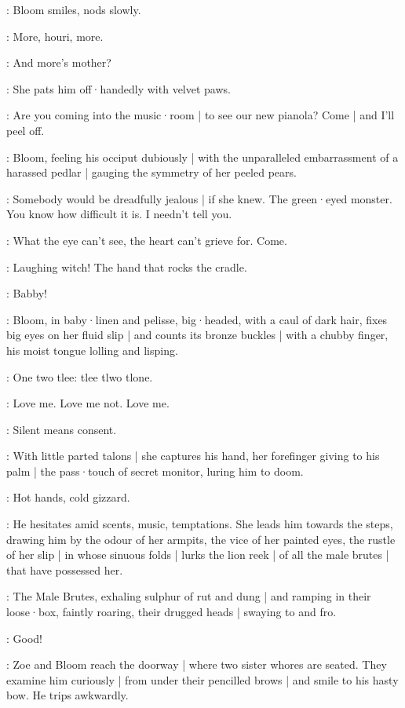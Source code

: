 :
Bloom smiles,
nods slowly.

\Bloom:
More,
houri,
more.

\Zoe:
And more's mother?

:
She pats him off·handedly with velvet paws.

\Zoe:
Are you coming into the music·room |
to see our new pianola?
Come |
and I'll peel off.

:
Bloom,
feeling his occiput dubiously |
with the unparalleled embarrassment of a harassed pedlar |
gauging the symmetry of her peeled pears.

\Bloom:
Somebody would be dreadfully jealous |
if she knew.
The green·eyed monster.
You know how difficult it is.
I needn't tell you.

\Zoe:
What the eye can't see,
the heart can't grieve for.
Come.

\Bloom:
Laughing witch!
The hand that rocks the cradle.

\Zoe:
Babby!

:
Bloom,
in baby·linen and pelisse,
big·headed,
with a caul of dark hair,
fixes big eyes on her fluid slip |
and counts its bronze buckles |
with a chubby finger,
his moist tongue lolling and lisping.

\Bloom:
One two tlee:
tlee tlwo tlone.

\Buckles[2]:
Love me.
Love me not.
Love me.

\Zoe:
Silent means consent.

:
With little parted talons |
she captures his hand,
her forefinger giving to his palm |
the pass·touch of secret monitor,
luring him to doom.

\Zoe:
Hot hands,
cold gizzard.

:
He hesitates amid scents,
music,
temptations.
She leads him towards the steps,
drawing him by the odour of her armpits,
the vice of her painted eyes,
the rustle of her slip |
in whose sinuous folds |
lurks the lion reek |
of all the male brutes |
that have possessed her.

:
The Male Brutes,
exhaling sulphur of rut and dung |
and ramping in their loose·box,
faintly roaring,
their drugged heads |
swaying to and fro.

\MaleBrutes:
Good!

:
Zoe and Bloom reach the doorway |
where two sister whores are seated.
They examine him curiously |
from under their pencilled brows |
and smile to his hasty bow.
He trips awkwardly.

